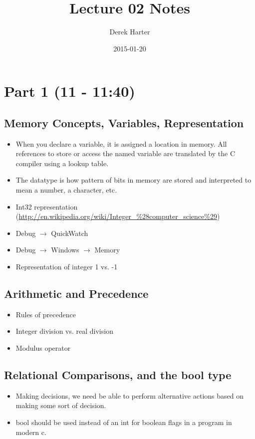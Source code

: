 \documentclass[11pt]{article}
\title{Lecture 02 Notes}
\author{Derek Harter}
\date{2015-01-20}
\begin{document}
\maketitle


\section{Part 1 (11 - 11:40)}
\label{sec-1}
\subsection{Memory Concepts, Variables, Representation}
\label{sec-1-1}


\begin{itemize}
\item When you declare a variable, it is assigned a location in memory.
  All references to store or access the named variable are translated
  by the C compiler using a lookup table.
\item The datatype is how pattern of bits in memory are stored and
  interpreted to mean a number, a character, etc.
\item Int32 representation (\href{http://en.wikipedia.org/wiki/Integer_%28computer_science%29}{http://en.wikipedia.org/wiki/Integer\_\%28computer\_science\%29})
\item Debug $\rightarrow$ QuickWatch
\item Debug $\rightarrow$ Windows $\rightarrow$ Memory
\item Representation of integer 1 vs. -1
\end{itemize}
\subsection{Arithmetic and Precedence}
\label{sec-1-2}

\begin{itemize}
\item Rules of precedence
\item Integer division vs. real division
\item Modulus operator
\end{itemize}
\subsection{Relational Comparisons, and the bool type}
\label{sec-1-3}

\begin{itemize}
\item Making decisions, we need be able to perform alternative actions
  based on making some sort of decision.
\item bool should be used instead of an int for boolean flags in a program in modern c.
\end{itemize}
\end{document}
